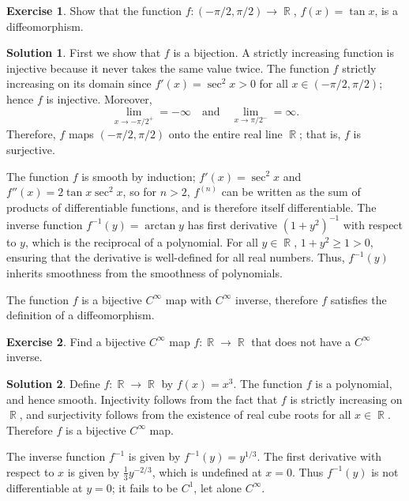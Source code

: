 \documentclass{article}
\theoremstyle{definition}
\newtheorem{exercise}{Exercise}
\newtheorem*{solution}{Solution}
\DeclareMathOperator{\R}{\mathbb{R}}
\begin{document}
\begin{exercise}
    Show that the function \(f:(-\pi/2,\pi/2)\to\R\), \(f(x)=\tan x\), is a diffeomorphism.
\end{exercise}
\begin{solution}
    First we show that \(f\) is a bijection. A strictly increasing function is injective because it never takes the same value twice. The function \(f\) strictly increasing on its domain since \(f'(x)=\sec^2 x>0\) for all \(x\in(-\pi/2,\pi/2)\); hence \(f\) is injective. Moreover, 
    \[\lim_{x\to-\pi/2^+}=-\infty\quad\text{and}\quad\lim_{x\to\pi/2^-}=\infty.\]
    Therefore, \(f\) maps \((-\pi/2,\pi/2)\) onto the entire real line \(\R\); that is, \(f\) is surjective. 
    
    The function \(f\) is smooth by induction; \(f'(x)=\sec^2 x\) and \(f''(x)=2\tan x\sec^2 x\), so for \(n>2\), \(f^{(n)}\) can be written as the sum of products of differentiable functions, and is therefore itself differentiable. The inverse function \(f^{-1}(y)=\arctan y\) has first derivative \((1+y^2)^{-1}\) with respect to \(y\), which is the reciprocal of a polynomial. For all \(y\in\R\), \(1+y^2\geq1>0\), ensuring that the derivative is well-defined for all real numbers. Thus, \(f^{-1}(y)\) inherits smoothness from the smoothness of polynomials.

    The function \(f\) is a bijective \(C^\infty\) map with \(C^\infty\) inverse, therefore \(f\) satisfies the definition of a diffeomorphism.
\end{solution}

\begin{exercise}
    Find a bijective \(C^\infty\) map \(f:\R\to\R\) that does not have a \(C^\infty\) inverse.
\end{exercise}
\begin{solution}
    Define \(f:\R\to\R\) by \(f(x)=x^3\). The function \(f\) is a polynomial, and hence smooth. Injectivity follows from the fact that \(f\) is strictly increasing on \(\R\), and surjectivity follows from the existence of real cube roots for all \(x\in\R\). Therefore \(f\) is a bijective \(C^\infty\) map.

    The inverse function \(f^{-1}\) is given by \(f^{-1}(y)=y^{1/3}\). The first derivative with respect to \(x\) is given by \(\frac{1}{3}y^{-2/3}\), which is undefined at \(x=0\). Thus \(f^{-1}(y)\) is not differentiable at \(y=0\); it fails to be \(C^1\), let alone \(C^\infty\).
\end{solution}
\end{document}
